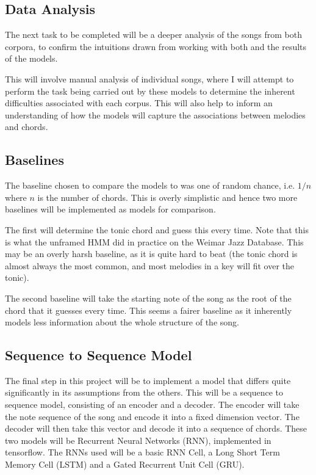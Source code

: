 \documentclass[bsc,singlespacing,logo, parskip, deptreport]{infthesis}
\begin{document}
\subsection{Data Analysis}

The next task to be completed will be a deeper analysis of the songs from both corpora, to confirm the intuitions drawn from working with both and the results of the models.

This will involve manual analysis of individual songs, where I will attempt to perform the task being carried out by these models to determine the inherent difficulties associated with each corpus. This will also help to inform an understanding of how the models will capture the associations between melodies and chords. 

\subsection{Baselines}

The baseline chosen to compare the models to was one of random chance, i.e. $1/n$ where $n$ is the number of chords. This is overly simplistic and hence two more baselines will be implemented as models for comparison.

The first will determine the tonic chord and guess this every time. Note that this is what the unframed HMM did in practice on the Weimar Jazz Database. This may be an overly harsh baseline, as it is quite hard to beat (the tonic chord is almost always the most common, and most melodies in a key will fit over the tonic).

The second baseline will take the starting note of the song as the root of the chord that it guesses every time. This seems a fairer baseline as it inherently models less information about the whole structure of the song.

\subsection{Sequence to Sequence Model}

The final step in this project will be to implement a model that differs quite significantly in its assumptions from the others. This will be a sequence to sequence model, consisting of an encoder and a decoder. The encoder will take the note sequence of the song and encode it into a fixed dimension vector. The decoder will then take this vector and decode it into a sequence of chords. These two models will be Recurrent Neural Networks (RNN), implemented in tensorflow. The RNNs used will be a basic RNN Cell, a Long Short Term Memory Cell (LSTM) and a Gated Recurrent Unit Cell (GRU).




\end{document}
